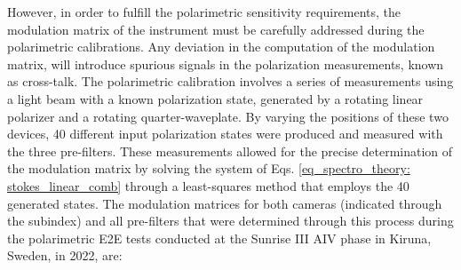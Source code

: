 However, in order to fulfill the polarimetric sensitivity requirements, the modulation matrix of the instrument must be carefully addressed during the polarimetric calibrations. Any deviation in the computation of the modulation matrix, will introduce spurious signals in the polarization measurements, known as cross-talk. The polarimetric calibration involves a series of measurements using a light beam with a known polarization state, generated by a rotating linear polarizer and a rotating quarter-waveplate. By varying the positions of these two devices, 40 different input polarization states were produced and measured with the three pre-filters. These measurements allowed for the precise determination of the modulation matrix by solving the system of Eqs. \eqref{eq_spectro_theory: stokes_linear_comb} through a least-squares method that employs the 40 generated states. The modulation matrices for both cameras (indicated through the subindex) and all pre-filters that were determined through this process during the polarimetric E2E tests conducted at the Sunrise III AIV phase in Kiruna, Sweden, in 2022, are:
